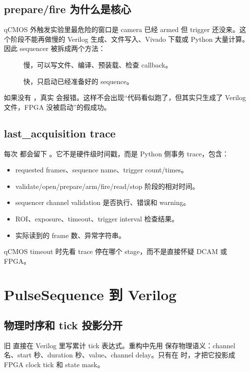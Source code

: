 \documentclass[11pt,oneside,openany]{book}
\begin{document}
\section{prepare/fire 为什么是核心}
qCMOS 外触发实验里最危险的窗口是 camera 已经 armed 但 trigger 还没来。这个阶段不能再做慢的 Verilog 生成、文件写入、Vivado 下载或 Python 大量计算。因此 sequencer 被拆成两个方法：
\begin{description}
  \item[] 慢，可以写文件、编译、预装载、检查 callback。
  \item[] 快，只启动已经准备好的 sequence。
\end{description}
如果没有 ，真实  会报错。这样不会出现“代码看似跑了，但其实只生成了 Verilog 文件，FPGA 没被启动”的假成功。

\section{last\_acquisition trace}
每次  都会留下 。它不是硬件级时间戳，而是 Python 侧事务 trace，包含：
\begin{itemize}
  \item requested frames、sequence name、trigger count/times。
  \item validate/open/prepare/arm/fire/read/stop 阶段的相对时间。
  \item sequencer channel validation 是否执行、错误和 warning。
  \item ROI、exposure、timeout、trigger interval 检查结果。
  \item 实际读到的 frame 数、异常字符串。
\end{itemize}
qCMOS timeout 时先看 trace 停在哪个 stage，而不是直接怀疑 DCAM 或 FPGA。

\chapter{PulseSequence 到 Verilog}
\section{物理时序和 tick 投影分开}
旧  直接在 Verilog 里写累计 tick 表达式。重构中先用  保存物理语义：channel 名、start 秒、duration 秒、value、channel delay。只有在  时，才把它投影成 FPGA clock tick 和 state mask。
\end{document}
